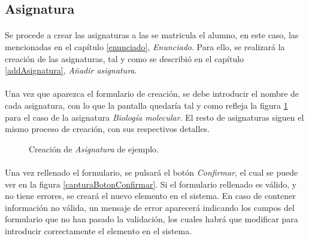 \subsection{Asignatura}

  \paragraph{}Se procede a crear las asignaturas a las se matricula el alumno,
  en este caso, las mencionadas en el capítulo \ref{enunciado},
  \textit{Enunciado}. Para ello, se realizará la creación de las asignaturas,
  tal y como se describió en el capítulo \ref{addAsignatura},
  \textit{Añadir asignatura}.

  \paragraph{}Una vez que aparezca el formulario de creación, se debe introducir
  el nombre de cada asignatura, con lo que la pantalla quedaría tal y como
  refleja la figura \ref{ejemploAddAsignatura} para el caso de la asignatura
  \textit{Biología molecular}. El resto de asignaturas siguen el mismo proceso
  de creación, con sus respectivos detalles.

  \begin{figure}[!ht]
    \begin{center}
      \caption{Creación de \textit{Asignatura} de ejemplo.}
      \label{ejemploAddAsignatura}
    \end{center}
  \end{figure}

  \paragraph{}Una vez rellenado el formulario, se pulsará el botón
  \textit{Confirmar}, el cual se puede ver en la figura
  \ref{capturaBotonConfirmar}. Si el formulario rellenado es válido, y no tiene
  errores, se creará el nuevo elemento en el sistema. En caso de contener
  información no válida, un mensaje de error aparecerá indicando los campos
  del formulario que no han pasado la validación, los cuales habrá que modificar
  para introducir correctamente el elemento en el sistema.
